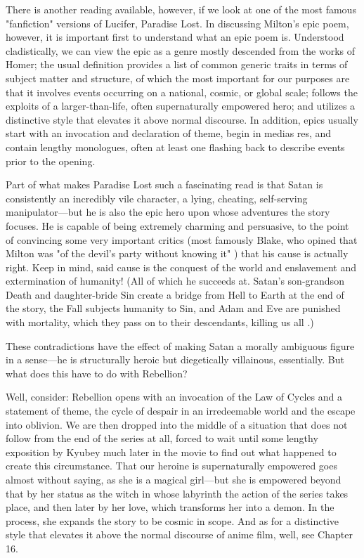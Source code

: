 There is another reading available, however, if we look at one of the most famous "fanfiction" versions of Lucifer, Paradise Lost. In discussing Milton's epic poem, however, it is important first to understand what an epic poem is. Understood cladistically, we can view the epic as a genre mostly descended from the works of Homer; the usual definition provides a list of common generic traits in terms of subject matter and structure, of which the most important for our purposes are that it involves events occurring on a national, cosmic, or global scale; follows the exploits of a larger-than-life, often supernaturally empowered hero; and utilizes a distinctive style that elevates it above normal discourse. In addition, epics usually start with an invocation and declaration of theme, begin in medias res, and contain lengthy monologues, often at least one flashing back to describe events prior to the opening. \cite{ref124}

Part of what makes Paradise Lost such a fascinating read is that Satan is consistently an incredibly vile character, a lying, cheating, self-serving manipulator—but he is also the epic hero upon whose adventures the story focuses. He is capable of being extremely charming and persuasive, to the point of convincing some very important critics (most famously Blake, who opined that Milton was "of the devil's party without knowing it" \cite{ref125}) that his cause is actually right. Keep in mind, said cause is the conquest of the world and enslavement and extermination of humanity! (All of which he succeeds at. Satan's son-grandson Death and daughter-bride Sin create a bridge from Hell to Earth at the end of the story, the Fall subjects humanity to Sin, and Adam and Eve are punished with mortality, which they pass on to their descendants, killing us all \cite{ref126}.) 

These contradictions have the effect of making Satan a morally ambiguous figure in a sense—he is structurally heroic but diegetically villainous, essentially. But what does this have to do with Rebellion?

Well, consider: Rebellion opens with an invocation of the Law of Cycles and a statement of theme, the cycle of despair in an irredeemable world and the escape into oblivion. We are then dropped into the middle of a situation that does not follow from the end of the series at all, forced to wait until some lengthy exposition by Kyubey much later in the movie to find out what happened to create this circumstance. That our heroine is supernaturally empowered goes almost without saying, as she is a magical girl—but she is empowered beyond that by her status as the witch in whose labyrinth the action of the series takes place, and then later by her love, which transforms her into a demon. In the process, she expands the story to be cosmic in scope. And as for a distinctive style that elevates it above the normal discourse of anime film, well, see Chapter 16.


